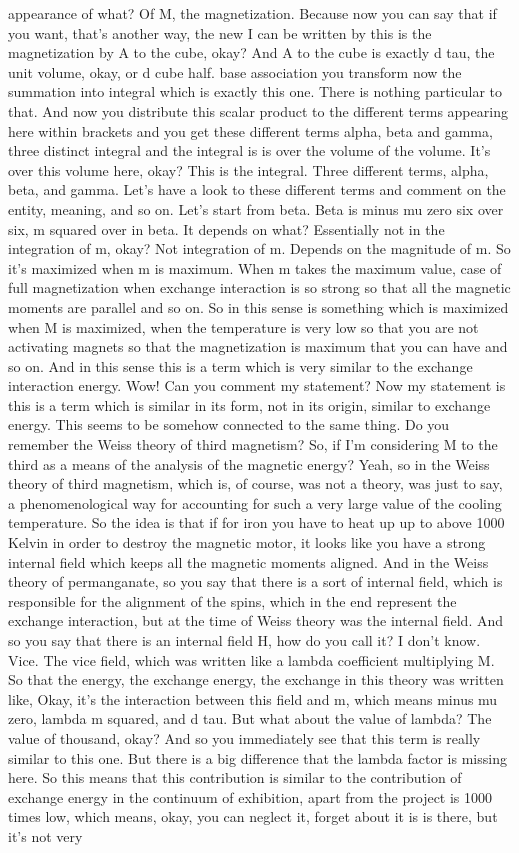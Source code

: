 appearance of what? Of M, the magnetization. Because now you can say that if you want, that's another way, the new I can be written by this is the magnetization by A to the cube, okay? And A to the cube is exactly d tau, the unit volume, okay, or d cube half. base association you transform now the summation into integral which is exactly this one. There is nothing particular to that. And now you distribute this scalar product to the different terms appearing here within brackets and you get these different terms alpha, beta and gamma, three distinct integral and the integral is is over the volume of the volume. It's over this volume here, okay? This is the integral. Three different terms, alpha, beta, and gamma. Let's have a look to these different terms and comment on the entity, meaning, and so on. Let's start from beta. Beta is minus mu zero six over six, m squared over in beta. It depends on what? Essentially not in the integration of m, okay? Not integration of m. Depends on the magnitude of m. So it's maximized when m is maximum. When m takes the maximum value, case of full magnetization when exchange interaction is so strong so that all the magnetic moments are parallel and so on. So in this sense is something which is maximized when M is maximized, when the temperature is very low so that you are not activating magnets so that the magnetization is maximum that you can have and so on. And in this sense this is a term which is very similar to the exchange interaction energy. Wow! Can you comment my statement? Now my statement is this is a term which is similar in its form, not in its origin, similar to exchange energy. This seems to be somehow connected to the same thing. Do you remember the Weiss theory of third magnetism? So, if I'm considering M to the third as a means of the analysis of the magnetic energy? Yeah, so in the Weiss theory of third magnetism, which is, of course, was not a theory, was just to say, a phenomenological way for accounting for such a very large value of the cooling temperature. So the idea is that if for iron you have to heat up up to above 1000 Kelvin in order to destroy the magnetic motor, it looks like you have a strong internal field which keeps all the magnetic moments aligned. And in the Weiss theory of permanganate, so you say that there is a sort of internal field, which is responsible for the alignment of the spins, which in the end represent the exchange interaction, but at the time of Weiss theory was the internal field. And so you say that there is an internal field H, how do you call it? I don't know. Vice. The vice field, which was written like a lambda coefficient multiplying M. So that the energy, the exchange energy, the exchange in this theory was written like, Okay, it's the interaction between this field and m, which means minus mu zero, lambda m squared, and d tau. But what about the value of lambda? The value of thousand, okay? And so you immediately see that this term is really similar to this one. But there is a big difference that the lambda factor is missing here. So this means that this contribution is similar to the contribution of exchange energy in the continuum of exhibition, apart from the project is 1000 times low, which means, okay, you can neglect it, forget about it is is there, but it's not very 